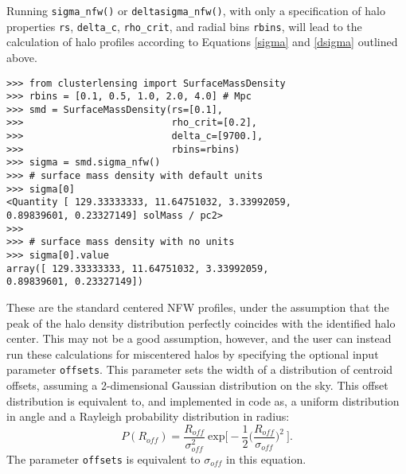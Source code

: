 \documentclass[twocolumn]{aastex6}
\newcommand{\code}{\lstinline[style=codeintext]}
\begin{document}
Running \code{sigma_nfw()} or \code{deltasigma_nfw()}, with only a specification of halo properties \code{rs}, \code{delta_c}, \code{rho_crit}, and radial bins \code{rbins}, will lead to the calculation of halo profiles according to Equations \ref{sigma} and \ref{dsigma} outlined above.

\begin{verbatim}
>>> from clusterlensing import SurfaceMassDensity
>>> rbins = [0.1, 0.5, 1.0, 2.0, 4.0] # Mpc
>>> smd = SurfaceMassDensity(rs=[0.1],
>>>                          rho_crit=[0.2],
>>>                          delta_c=[9700.],
>>>                          rbins=rbins)
>>> sigma = smd.sigma_nfw()
>>> # surface mass density with default units
>>> sigma[0]
<Quantity [ 129.33333333, 11.64751032, 3.33992059,
0.89839601, 0.23327149] solMass / pc2>
>>> 
>>> # surface mass density with no units
>>> sigma[0].value
array([ 129.33333333, 11.64751032, 3.33992059,
0.89839601, 0.23327149])
\end{verbatim}

These are the standard centered NFW profiles, under the assumption that the peak of the halo density distribution perfectly coincides with the identified halo center. This may not be a good assumption, however, and the user can instead run these calculations for miscentered halos by specifying the optional input parameter \code{offsets}. This parameter sets the width of a distribution of centroid offsets, assuming a 2-dimensional Gaussian distribution on the sky. This offset distribution is equivalent to, and implemented in code as, a uniform distribution in angle and a Rayleigh probability distribution in radius:
\begin{equation}\label{PofR}
P(R_{off})=\frac{R_{off}}{\sigma_{off}^2}\ \mathrm{exp}\bigg[-\frac{1}{2}\bigg(\frac{R_{off}}{\sigma_{off}}\bigg)^2\ \bigg].
\end{equation}
The parameter \code{offsets} is equivalent to $\sigma_{off}$ in this equation.
\end{document}

